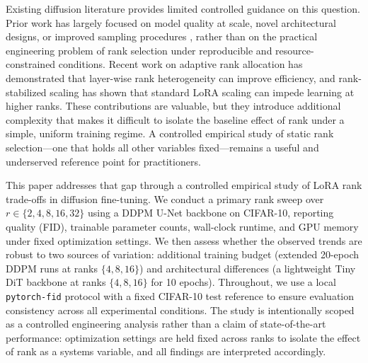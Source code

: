 \documentclass[pdflatex,sn-mathphys-num]{Springer_format/sn-jnl}
\begin{document}
Existing diffusion literature provides limited controlled guidance on this question.
Prior work has largely focused on model quality at scale, novel architectural designs, or
improved sampling procedures \cite{ho2020ddpm, peebles2023dit}, rather than on the
practical engineering problem of rank selection under reproducible and resource-constrained
conditions. Recent work on adaptive rank allocation \cite{zhang2023adalora,
chang2025elalora} has demonstrated that layer-wise rank heterogeneity can improve
efficiency, and rank-stabilized scaling \cite{kalajdzievski2023rslora} has shown that
standard LoRA scaling can impede learning at higher ranks. These contributions are
valuable, but they introduce additional complexity that makes it difficult to isolate the
baseline effect of rank under a simple, uniform training regime. A controlled empirical
study of static rank selection---one that holds all other variables fixed---remains a
useful and underserved reference point for practitioners.

This paper addresses that gap through a controlled empirical study of LoRA rank
trade-offs in diffusion fine-tuning. We conduct a primary rank sweep over
$r \in \{2, 4, 8, 16, 32\}$ using a DDPM U-Net backbone on CIFAR-10, reporting quality
(FID), trainable parameter counts, wall-clock runtime, and GPU memory under fixed
optimization settings. We then assess whether the observed trends are robust to two
sources of variation: additional training budget (extended 20-epoch DDPM runs at ranks
$\{4, 8, 16\}$) and architectural differences (a lightweight Tiny DiT backbone at ranks
$\{4, 8, 16\}$ for 10 epochs). Throughout, we use a local \texttt{pytorch-fid} protocol
with a fixed CIFAR-10 test reference to ensure evaluation consistency across all
experimental conditions. The study is intentionally scoped as a controlled engineering
analysis rather than a claim of state-of-the-art performance: optimization settings are
held fixed across ranks to isolate the effect of rank as a systems variable, and all
findings are interpreted accordingly.
  
\end{document}
